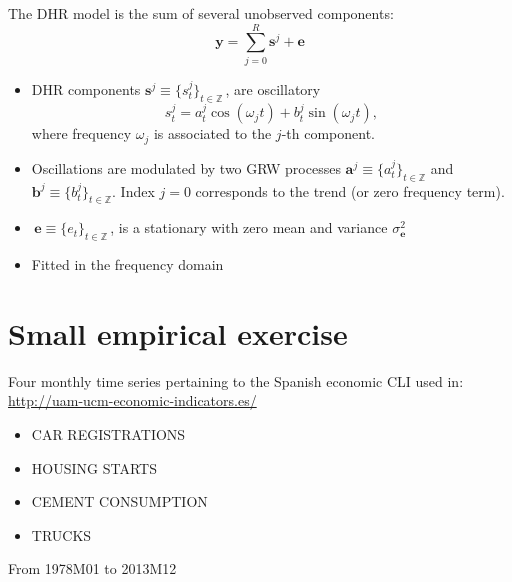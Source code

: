 \begin{slide}
 The {DHR} model is the
sum of several unobserved components:
\begin{equation}
\boldsymbol{y}=\sum_{j=0}^{R}\boldsymbol{s}^{j}+\boldsymbol{e}
\end{equation}
\begin{itemize}
\item {DHR} components
  $\boldsymbol{s}^{j}\equiv\{s_{t}^{j}\}_{t\in\mathbb{Z}}\,$, are
  oscillatory
  \begin{equation}
    s_{t}^{j}=a_{t}^{j}\cos(\omega_{j}t)+b_{t}^{j}\sin(\omega_{j}t),
  \end{equation}
  where frequency $\omega_{j}$ is associated to the $j$-th component.
\item Oscillations are modulated by two {GRW} processes 
  $\boldsymbol{a}^{j}\equiv\{a^{j}_t\}_{t\in\mathbb{Z}}$ and
  $\boldsymbol{b}^{j}\equiv\{b^{j}_t\}_{t\in\mathbb{Z}}$.
  Index $j=0$ corresponds to the trend (or zero frequency term).
\item $\,{\boldsymbol{e}}\equiv\{e_{t}\}_{t\in\mathbb{Z}}\,$, is a
  stationary with zero mean and variance $\sigma_{\boldsymbol{e}}^{2}$
\item Fitted in the frequency domain
\end{itemize}
\end{slide}

\section[Exercise]{Small empirical exercise}

\begin{slide}

  Four monthly time series pertaining to the Spanish economic CLI used
  in: \url{http://uam-ucm-economic-indicators.es/}
  \bigskip
  
  \begin{itemize}
  \item CAR REGISTRATIONS
  \item HOUSING STARTS
  \item CEMENT CONSUMPTION
  \item TRUCKS
  \end{itemize}
  \bigskip

  From 1978M01 to 2013M12
\end{slide}

